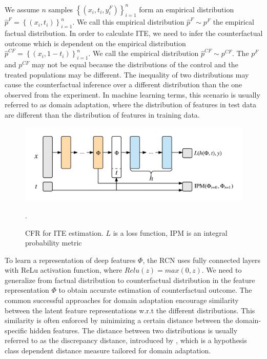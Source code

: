 \documentclass{article}
\begin{document}
We assume $n$ samples $\left \{ (x_i, t_i, y_i^F) \right \}_{i=1}^n$ form an empirical distribution $\hat{p}^F  = \left \{ (x_i, t_i) \right \}_{i=1}^n$. We call this empirical distribution $\hat{p}^F \sim p^F$ the empirical factual distribution. In order to calculate ITE, we need to infer the counterfactual outcome which is dependent on the empirical distribution $\hat{p}^{CF}  = \left \{ (x_i, 1-t_i) \right \}_{i=1}^n$. We call the empirical distribution $\hat{p}^{CF} \sim p^{CF}$. The $p^{F}$ and $p^{CF}$ may not be equal because the distributions of the control and the treated populations may be different. The inequality of two distributions may cause the counterfactual inference over a different distribution than the one observed from the experiment. In machine learning terms, this scenario is usually referred to as domain adaptation, where the distribution of features in test data are different than the distribution of features in training data.

\begin{figure}[h]
  \centering
  \includegraphics[width=0.95\columnwidth]{cfr.png}
  \caption{CFR for ITE estimation. $L$ is a loss function, IPM is an integral probability metric}.
  ~\label{fg:cfr-model}
\end{figure}

To learn a representation of deep features $\Phi$, the RCN uses fully connected layers with ReLu activation function, where $Relu(z) = max(0, z)$. We need to generalize from factual distribution to counterfactual distribution in the feature representation $\Phi$ to obtain accurate estimation of counterfactual outcome. The common successful approaches for domain adaptation encourage similarity between the latent feature representations w.r.t the different distributions. This similarity is often enforced by minimizing a certain distance between the domain-specific hidden features. The distance between two distributions is usually referred to as the discrepancy distance, introduced by \cite{Mansour2009-fh}, which is a hypothesis class dependent distance measure tailored for domain adaptation. 
\end{document}

